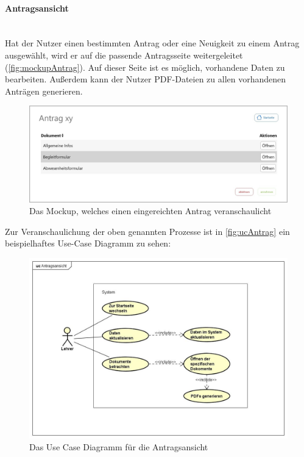 \paragraph{Antragsansicht}
~\\
Hat der Nutzer einen bestimmten Antrag oder eine Neuigkeit zu einem Antrag ausgewählt, wird er auf die passende Antragsseite weitergeleitet (\autoref{fig:mockupAntrag}). Auf dieser Seite ist es möglich, vorhandene Daten zu bearbeiten. Außerdem kann der Nutzer PDF-Dateien zu allen vorhandenen Anträgen generieren.
\begin{figure}[H]
	\centering
	\includegraphics[width=1\linewidth]{images/Mockup-Antragsansicht}
	\caption[Mockup Antragsansicht]{Das Mockup, welches einen eingereichten Antrag veranschaulicht}
	\label{fig:mockupAntrag}
\end{figure}
Zur Veranschaulichung der oben genannten Prozesse ist in \autoref{fig:ucAntrag} ein beispielhaftes Use-Case Diagramm zu sehen: 
\begin{figure}[H]
	\centering
	\includegraphics[width=1\linewidth]{images/uc-antrag}
	\caption[Use Case Diagramm Antragsansicht]{Das Use Case Diagramm für die Antragsansicht}
	\label{fig:ucAntrag}
\end{figure}